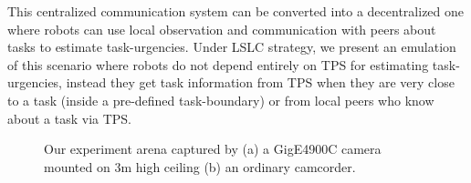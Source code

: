 \documentclass[final,5p,times,twocolumn]{elsarticle}
\begin{document}
This centralized communication system can be converted into a decentralized one where robots can use local observation and communication with peers about tasks to estimate task-urgencies. Under LSLC strategy, we present an emulation of this scenario where robots do not depend entirely on TPS for estimating task-urgencies, instead they get task information from TPS when they are very close to a task (inside a pre-defined task-boundary) or from local peers who know about a task via TPS.
\begin{figure}
\centering
\hspace*{1cm}
\newline
{}
\caption{Our experiment arena captured by (a) a GigE4900C camera mounted on 3m high ceiling (b) an ordinary camcorder.}
\label{fig:expt-arena} %
\end{figure}
\end{document}
